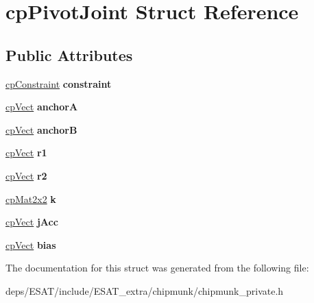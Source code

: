 \hypertarget{structcp_pivot_joint}{}\section{cp\+Pivot\+Joint Struct Reference}
\label{structcp_pivot_joint}
\subsection*{Public Attributes}
\begin{DoxyCompactItemize}
\item 
\mbox{\label{structcp_pivot_joint_af1cac6b4862609255538a932e1ef380a}} 
\mbox{\hyperlink{structcp_constraint}{cp\+Constraint}} {\bfseries constraint}
\item 
\mbox{\label{structcp_pivot_joint_af2cdd0e3055287b4d416a4dabc732406}} 
\mbox{\hyperlink{structcp_vect}{cp\+Vect}} {\bfseries anchorA}
\item 
\mbox{\label{structcp_pivot_joint_a27c40ef45bffe971b3b80a7a5ed157c8}} 
\mbox{\hyperlink{structcp_vect}{cp\+Vect}} {\bfseries anchorB}
\item 
\mbox{\label{structcp_pivot_joint_aa79b763321f06525109ab43363fd6c61}} 
\mbox{\hyperlink{structcp_vect}{cp\+Vect}} {\bfseries r1}
\item 
\mbox{\label{structcp_pivot_joint_af50465e6c92e3c6b155698c80dcd24fd}} 
\mbox{\hyperlink{structcp_vect}{cp\+Vect}} {\bfseries r2}
\item 
\mbox{\label{structcp_pivot_joint_a8e1a177d020a33f2b27ca1c5f76aeb4a}} 
\mbox{\hyperlink{structcp_mat2x2}{cp\+Mat2x2}} {\bfseries k}
\item 
\mbox{\label{structcp_pivot_joint_a5fdaa4d61cf4fff7f2b5486135dec8f0}} 
\mbox{\hyperlink{structcp_vect}{cp\+Vect}} {\bfseries j\+Acc}
\item 
\mbox{\label{structcp_pivot_joint_acf18bcfb9c42364240853413b6b16b51}} 
\mbox{\hyperlink{structcp_vect}{cp\+Vect}} {\bfseries bias}
\end{DoxyCompactItemize}


The documentation for this struct was generated from the following file\+:\begin{DoxyCompactItemize}
\item 
deps/\+E\+S\+A\+T/include/\+E\+S\+A\+T\+\_\+extra/chipmunk/chipmunk\+\_\+private.\+h\end{DoxyCompactItemize}
